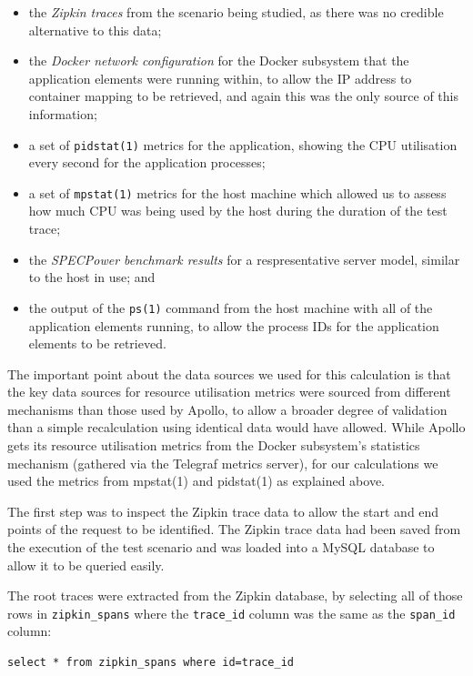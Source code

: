 \begin{itemize}
	\item the \emph{Zipkin traces} from the scenario being studied, as there was no credible alternative to this data;
	\item the \emph{Docker network configuration} for the Docker subsystem that the application elements were running within, to allow the IP address to container mapping to be retrieved, and again this was the only source of this information;
	\item a set of \texttt{pidstat(1)} metrics for the application, showing the CPU utilisation every second for the application processes;
	\item a set of \texttt{mpstat(1)} metrics for the host machine which allowed us to assess how much CPU was being used by the host during the duration of the test trace;
	\item the \emph{SPECPower benchmark results} for a respresentative server model, similar to the host in use; and
	\item the output of the \texttt{ps(1)} command from the host machine with all of the application elements running, to allow the process IDs for the application elements to be retrieved.
\end{itemize}

The important point about the data sources we used for this calculation is that the key data sources for resource utilisation metrics were sourced from different mechanisms than those used by Apollo, to allow a broader degree of validation than a simple recalculation using identical data would have allowed.  While Apollo gets its resource utilisation metrics from the Docker subsystem's statistics mechanism (gathered via the Telegraf metrics server), for our calculations we used the metrics from mpstat(1) and pidstat(1) as explained above.

The first step was to inspect the Zipkin trace data to allow the start and end points of the request to be identified.  The Zipkin trace data had been saved from the execution of the test scenario and was loaded into a MySQL database to allow it to be queried easily.

The root traces were extracted from the Zipkin database, by selecting all of those rows in \texttt{zipkin\_spans} where the \texttt{trace\_id} column was the same as the \texttt{span\_id} column:

\lstset{language=SQL}
\begin{lstlisting}
select * from zipkin_spans where id=trace_id
\end{lstlisting}



